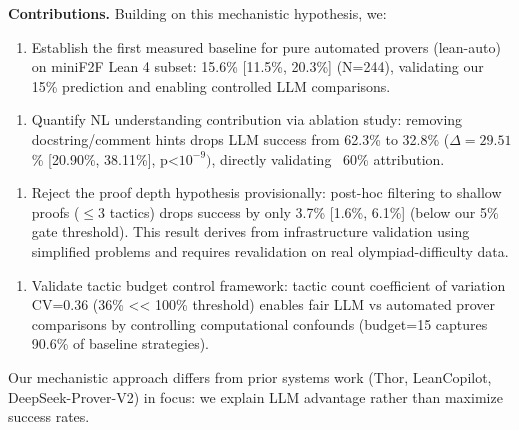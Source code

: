 \textbf{Contributions.} Building on this mechanistic hypothesis, we:

\begin{enumerate}
\item Establish the first measured baseline for pure automated provers (lean-auto) on miniF2F Lean 4 subset: 15.6\% [11.5\%, 20.3\%] (N=244), validating our 15\% prediction and enabling controlled LLM comparisons.
\end{enumerate}

\begin{enumerate}
\item Quantify NL understanding contribution via ablation study: removing docstring/comment hints drops LLM success from 62.3\% to 32.8\% ($\Delta =29.51$\% [20.90\%, 38.11\%], p<$10^{-9})$, directly validating ~60\% attribution.
\end{enumerate}

\begin{enumerate}
\item Reject the proof depth hypothesis provisionally: post-hoc filtering to shallow proofs ($\leq 3$ tactics) drops success by only 3.7\% [1.6\%, 6.1\%] (below our 5\% gate threshold). This result derives from infrastructure validation using simplified problems and requires revalidation on real olympiad-difficulty data.
\end{enumerate}

\begin{enumerate}
\item Validate tactic budget control framework: tactic count coefficient of variation CV=0.36 (36\% << 100\% threshold) enables fair LLM vs automated prover comparisons by controlling computational confounds (budget=15 captures 90.6\% of baseline strategies).
\end{enumerate}

Our mechanistic approach differs from prior systems work (Thor, LeanCopilot, DeepSeek-Prover-V2) in focus: we explain LLM advantage rather than maximize success rates.
